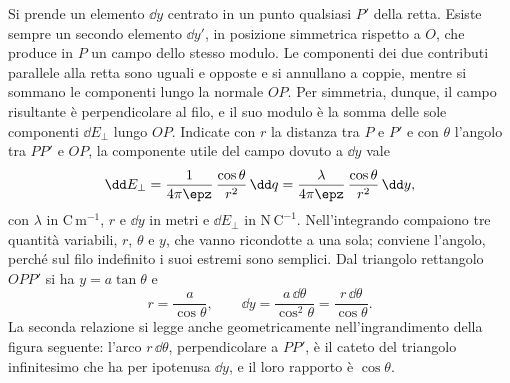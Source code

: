 \documentclass[main.tex]{subfiles}
\begin{document}
Si prende un elemento $\dd y$ centrato in un punto qualsiasi $P'$ della retta. Esiste sempre un secondo elemento $\dd y'$, in posizione simmetrica rispetto a $O$, che produce in $P$ un campo dello stesso modulo. Le componenti dei due contributi parallele alla retta sono uguali e opposte e si annullano a coppie, mentre si sommano le componenti lungo la normale $OP$. Per simmetria, dunque, il campo risultante è perpendicolare al filo, e il suo modulo è la somma delle sole componenti $\dd E_{\perp}$ lungo $OP$. Indicate con $r$ la distanza tra $P$ e $P'$ e con $\theta$ l'angolo tra $PP'$ e $OP$, la componente utile del campo dovuto a $\dd y$ vale
\[
\dd E_{\perp}=\frac{1}{4\pi\epz}\,\frac{\cos\theta}{r^{2}}\,\dd q=\frac{\lambda}{4\pi\epz}\,\frac{\cos\theta}{r^{2}}\,\dd y ,
\]
con $\lambda$ in $\mathrm{C\,m^{-1}}$, $r$ e $\dd y$ in metri e $\dd E_\perp$ in $\mathrm{N\,C^{-1}}$. Nell'integrando compaiono tre quantità variabili, $r$, $\theta$ e $y$, che vanno ricondotte a una sola; conviene l'angolo, perché sul filo indefinito i suoi estremi sono semplici. Dal triangolo rettangolo $OPP'$ si ha $y=a\tan\theta$ e
\[
r=\frac{a}{\cos\theta},\qquad \dd y=\frac{a\,\dd\theta}{\cos^{2}\theta}=\frac{r\,\dd\theta}{\cos\theta} .
\]
La seconda relazione si legge anche geometricamente nell'ingrandimento della figura seguente: l'arco $r\,\dd\theta$, perpendicolare a $PP'$, è il cateto del triangolo infinitesimo che ha per ipotenusa $\dd y$, e il loro rapporto è $\cos\theta$.
\end{document}
